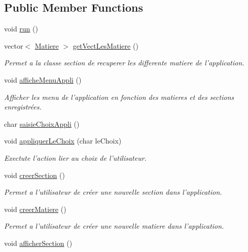 \subsection*{Public Member Functions}
\begin{DoxyCompactItemize}
\item 
void \hyperlink{class_application_a68965449404743bf1add056784d6cf81}{run} ()
\item 
vector$<$ \hyperlink{class_matiere}{Matiere} $>$ \hyperlink{class_application_a2aa1a9c2e0c773e3817acb4c8ff87f1d}{get\+Vect\+Les\+Matiere} ()
\begin{DoxyCompactList}\small\item\em Permet a la classe section de recuperer les differente matiere de l'application. \end{DoxyCompactList}\item 
void \hyperlink{class_application_a0c235075ac547b2cdec2e9fb8549747d}{affiche\+Menu\+Appli} ()
\begin{DoxyCompactList}\small\item\em Afficher les menu de l'application en fonction des matieres et des sections enregistrées. \end{DoxyCompactList}\item 
char \hyperlink{class_application_a9e50be67265ccc03145ed69305fc86f5}{saisie\+Choix\+Appli} ()
\item 
void \hyperlink{class_application_a48c55a5716d6731fe6191881f692e57d}{appliquer\+Le\+Choix} (char le\+Choix)
\begin{DoxyCompactList}\small\item\em Exectute l'action lier au choix de l'utilisateur. \end{DoxyCompactList}\item 
void \hyperlink{class_application_a4a0c001b058e6ff628e38bce5cc6c56b}{creer\+Section} ()
\begin{DoxyCompactList}\small\item\em Permet a l'utilisateur de créer une nouvelle section dans l'application. \end{DoxyCompactList}\item 
void \hyperlink{class_application_aea20c849e7ce31bf60b091b45e631de7}{creer\+Matiere} ()
\begin{DoxyCompactList}\small\item\em Permet a l'utilisateur de créer une nouvelle matiere dans l'application. \end{DoxyCompactList}\item 
void \hyperlink{class_application_a680db3e1303890352806d7a7e9be5601}{afficher\+Section} ()

\end{DoxyCompactItemize}
